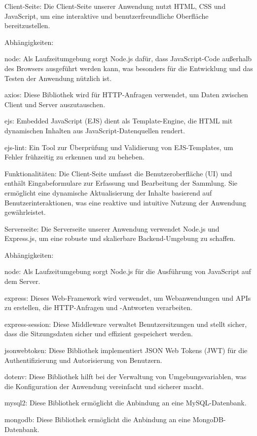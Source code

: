 Client-Seite:
Die Client-Seite unserer Anwendung nutzt HTML, CSS und JavaScript, um eine interaktive und benutzerfreundliche Oberfläche bereitzustellen.

Abhängigkeiten:

node: Als Laufzeitumgebung sorgt Node.js dafür, dass JavaScript-Code außerhalb des Browsers ausgeführt werden kann, was besonders für die Entwicklung und das Testen der Anwendung nützlich ist.

axios: Diese Bibliothek wird für HTTP-Anfragen verwendet, um Daten zwischen Client und Server auszutauschen.

ejs: Embedded JavaScript (EJS) dient als Template-Engine, die HTML mit dynamischen Inhalten aus JavaScript-Datenquellen rendert.

ejs-lint: Ein Tool zur Überprüfung und Validierung von EJS-Templates, um Fehler frühzeitig zu erkennen und zu beheben.

Funktionalitäten:
Die Client-Seite umfasst die Benutzeroberfläche (UI) und enthält Eingabeformulare zur Erfassung und Bearbeitung der Sammlung.
Sie ermöglicht eine dynamische Aktualisierung der Inhalte basierend auf Benutzerinteraktionen, was eine reaktive und intuitive Nutzung der Anwendung gewährleistet.

Serverseite:
Die Serverseite unserer Anwendung verwendet Node.js und Express.js, um eine robuste und skalierbare Backend-Umgebung zu schaffen.

Abhängigkeiten:

node: Als Laufzeitumgebung sorgt Node.js für die Ausführung von JavaScript auf dem Server.

express: Dieses Web-Framework wird verwendet, um Webanwendungen und APIs zu erstellen, die HTTP-Anfragen und -Antworten verarbeiten.

express-session: Diese Middleware verwaltet Benutzersitzungen und stellt sicher, dass die Sitzungsdaten sicher und effizient gespeichert werden.

jsonwebtoken: Diese Bibliothek implementiert JSON Web Tokens (JWT) für die Authentifizierung und Autorisierung von Benutzern.

dotenv: Diese Bibliothek hilft bei der Verwaltung von Umgebungsvariablen, was die Konfiguration der Anwendung vereinfacht und sicherer macht.

mysql2: Diese Bibliothek ermöglicht die Anbindung an eine MySQL-Datenbank.

mongodb: Diese Bibliothek ermöglicht die Anbindung an eine MongoDB-Datenbank.

